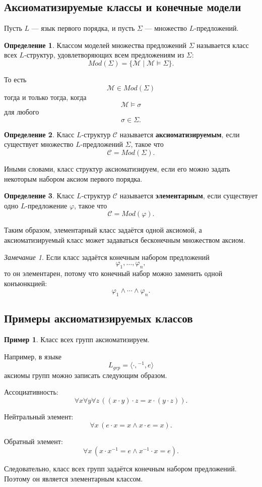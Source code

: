 \documentclass[12pt,a4paper,oneside,openany]{book}
\theoremstyle{definition}
\newtheorem{definition}{Определение}[chapter]
\newtheorem{example}{Пример}[chapter]
\theoremstyle{plain}
\theoremstyle{remark}
\newtheorem{remark}{Замечание}[chapter]
\begin{document}
\subsection{Аксиоматизируемые классы и конечные модели}

Пусть $L$ — язык первого порядка, и пусть $\Sigma$ — множество $L$-предложений.

\begin{definition}
Классом моделей множества предложений $\Sigma$ называется класс всех $L$-структур, удовлетворяющих всем предложениям из $\Sigma$:
\[
Mod(\Sigma)
=
\{\mathcal M\mid \mathcal M\models\Sigma\}.
\]
\end{definition}

То есть
\[
\mathcal M\in Mod(\Sigma)
\]
тогда и только тогда, когда
\[
\mathcal M\models\sigma
\]
для любого
\[
\sigma\in\Sigma.
\]

\begin{definition}
Класс $L$-структур $\mathcal C$ называется \textbf{аксиоматизируемым}, если существует множество $L$-предложений $\Sigma$, такое что
\[
\mathcal C=Mod(\Sigma).
\]
\end{definition}

Иными словами, класс структур аксиоматизируем, если его можно задать некоторым набором аксиом первого порядка.

\begin{definition}
Класс $L$-структур $\mathcal C$ называется \textbf{элементарным}, если существует одно $L$-предложение $\varphi$, такое что
\[
\mathcal C=Mod(\varphi).
\]
\end{definition}

Таким образом, элементарный класс задаётся одной аксиомой, а аксиоматизируемый класс может задаваться бесконечным множеством аксиом.

\begin{remark}
Если класс задаётся конечным набором предложений
\[
\varphi_1,\ldots,\varphi_n,
\]
то он элементарен, потому что конечный набор можно заменить одной конъюнкцией:
\[
\varphi_1\wedge\cdots\wedge\varphi_n.
\]
\end{remark}

\subsection{Примеры аксиоматизируемых классов}

\begin{example}
Класс всех групп аксиоматизируем.

Например, в языке
\[
L_{grp}=\langle \cdot,{}^{-1},e\rangle
\]
аксиомы групп можно записать следующим образом.

Ассоциативность:
\[
\forall x\forall y\forall z\,
((x\cdot y)\cdot z=x\cdot(y\cdot z)).
\]

Нейтральный элемент:
\[
\forall x\,(e\cdot x=x\wedge x\cdot e=x).
\]

Обратный элемент:
\[
\forall x\,(x\cdot x^{-1}=e\wedge x^{-1}\cdot x=e).
\]

Следовательно, класс всех групп задаётся конечным набором предложений. Поэтому он является элементарным классом.
\end{example}
\end{document}
